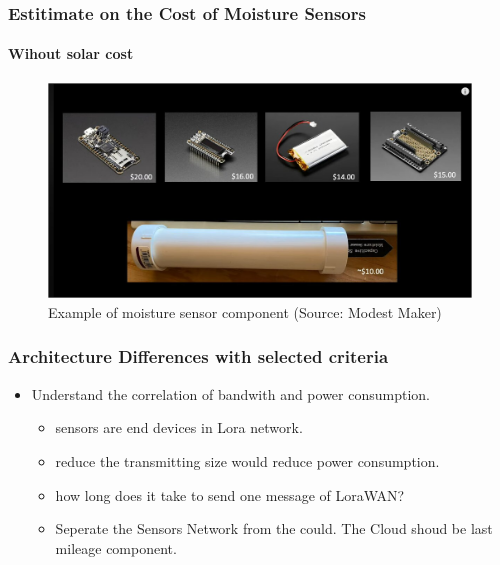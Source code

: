 \documentclass{beamer}
\begin{document}
\begin{frame}[t]
  \frametitle{Estitimate on the Cost of Moisture Sensors}
  \framesubtitle{Wihout solar cost}

  \begin{figure}[h]

  \includegraphics[scale=0.15]{modest-make-soil-moisture-irrigration.jpg}

    \caption{Example of moisture sensor component (Source: Modest Maker)}
\end{figure}

\end{frame}



\begin{frame}
  \frametitle{Architecture Differences with selected criteria}
  \begin{itemize}
    \item Understand the correlation of bandwith and power consumption.
      \begin{itemize}
        \item sensors are end devices in Lora network.
	\item reduce the transmitting size would reduce power consumption. 
	\item how long does it take to send one message of LoraWAN?
	\item Seperate the Sensors Network from the could. The Cloud shoud be last mileage component.
      \end{itemize}
  \end{itemize}
\end{frame}
\end{document}
